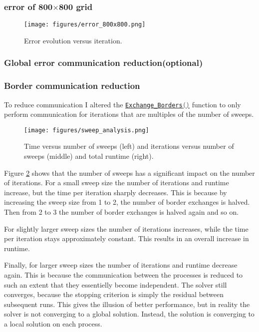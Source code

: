 \subsubsection{error of 800$\times$800 grid}
\begin{figure}[H]
    \centering
    \texttt{[image: figures/error\_800x800.png]}
    \caption{Error evolution versus iteration.}
    \label{fig:error_800}
\end{figure}

\subsubsection{Global error communication reduction(optional)}

\subsubsection{Border communication reduction}
To reduce communication I altered the 
\href{https://github.com/PhilipSoliman/hpc-labs/blob/b16da8d7ee717657e13c316369fa0996da7816cc/assignment_1/ppoisson2.c#L1083}{\lstinline[language=C]{Exchange_Borders()}} 
function to only perform communication for iterations that are multiples of the number of sweeps.
\begin{figure}[H]
    \centering
    \texttt{[image: figures/sweep\_analysis.png]}
    \caption{Time versus number of sweeps (left) and iterations versus number of sweeps (middle) and total runtime (right).}
    \label{fig:sweep_analysis}
\end{figure}
Figure \ref{fig:sweep_analysis} shows that the number of sweeps has a significant impact on the number of iterations. 
For a small sweep size the number of iterations and runtime increase, but the time per iteration sharply decreases. 
This is because by increasing the sweep size from 1 to 2, the number of border exchanges is halved. Then from 
2 to 3 the number of border exchanges is halved again and so on. 

For slightly larger sweep sizes the number of iterations increases, while the time per iteration stays approximately constant.
This results in an overall increase in runtime. 

Finally, for larger sweep sizes the number of iterations and runtime decrease again. This is because the communication between 
the processes is reduced to such an extent that they essentielly become independent. The solver still converges, because
the stopping criterion is simply the residual between subsequent runs. This gives the illusion of better performance, but
in reality the solver is not converging to a global solution. Instead, the solution is converging to a local solution on each 
process.

